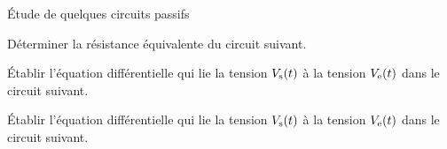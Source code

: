 \begin{exo}[MPSI]{Étude de quelques circuits passifs}
\begin{quest}
\item Déterminer la résistance équivalente du circuit suivant.


\begin{center}

\end{center}


\item Établir l'équation différentielle qui lie la tension $V_{\rm s}(t)$ à la tension $V_{\rm e}(t)$ dans le circuit suivant.

\begin{center}

\end{center}

\item Établir l'équation différentielle qui lie la tension $V_{\rm s}(t)$ à la tension $V_{\rm e}(t)$ dans le circuit suivant.

\begin{center}

\end{center}


\end{quest}
\end{exo}

